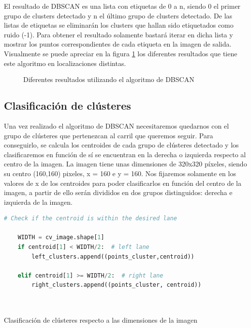 El resultado de DBSCAN es una lista con etiquetas de 0 a n, siendo 0 el primer grupo de clusters detectado y 
n el último grupo de clusters detectado. De las listas de etiquetas se eliminarán los clusters que hallan sido etiquetados como ruido (-1). Para obtener el resultado solamente bastará iterar en dicha lista y mostrar los puntos correspondientes de cada etiqueta en la imagen de salida.
Visualmente se puede apreciar en la figura \ref{f:Rresultadosdbscan} los diferentes resultados que tiene este algoritmo en localizaciones distintas. 

\begin{figure}[H]
  \begin{center}
  \caption{Diferentes resultados utilizando el algoritmo de DBSCAN}
  \label{f:Rresultadosdbscan}
  \end{center}
 \end{figure}



\subsection{Clasificación de clústeres}
\label{clasificación:cluster}
Una vez realizado el algoritmo de DBSCAN necesitaremos quedarnos con el grupo de clústeres que pertenezcan al carril que queremos seguir. Para conseguirlo, se calcula los centroides de cada
grupo de clústeres detectado y los clasificaremos en función de sí se encuentran en la derecha o izquierda respecto al centro de la imagen. La imagen tiene unas dimensiones de 320x320 píxeles, 
siendo su centro (160,160) pixeles, x = 160 e y = 160. Nos fijaremos solamente en los valores de x de los centroides para poder clasificarlos en función del centro de la 
imagen, a partir de ello serán divididos en dos grupos distinguidos: derecha e izquierda de la imagen. \newline

\begin{code}[h]
  \begin{lstlisting}[language=Python]
    # Check if the centroid is within the desired lane

    WIDTH = cv_image.shape[1]
    if centroid[1] < WIDTH/2:  # left lane
        left_clusters.append((points_cluster,centroid))
       
    elif centroid[1] >= WIDTH/2:  # right lane
        right_clusters.append((points_cluster, centroid))
       
  
  \end{lstlisting}
  \caption[Clasificación de clústeres según las dimensiones de la imagen ]{Clasificación de clústeres respecto a las dimensiones de la imagen}
  \label{cod:Clasificación de clústeres}
  \end{code}  


